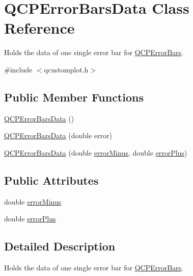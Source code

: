 \hypertarget{class_q_c_p_error_bars_data}{}\section{Q\+C\+P\+Error\+Bars\+Data Class Reference}
\label{class_q_c_p_error_bars_data}


Holds the data of one single error bar for \hyperlink{class_q_c_p_error_bars}{Q\+C\+P\+Error\+Bars}.  




{\ttfamily \#include $<$qcustomplot.\+h$>$}

\subsection*{Public Member Functions}
\begin{DoxyCompactItemize}
\item 
\hyperlink{class_q_c_p_error_bars_data_ac18bdb46dec56f8df7f3c99d058cc725}{Q\+C\+P\+Error\+Bars\+Data} ()
\item 
\hyperlink{class_q_c_p_error_bars_data_a73ebdaa55fa7f0052b70895b28edb444}{Q\+C\+P\+Error\+Bars\+Data} (double error)
\item 
\hyperlink{class_q_c_p_error_bars_data_a7c61e42d87aea3312262d5429bc28387}{Q\+C\+P\+Error\+Bars\+Data} (double \hyperlink{class_q_c_p_error_bars_data_af8aaea160e52c14c57836224ee78020b}{error\+Minus}, double \hyperlink{class_q_c_p_error_bars_data_ad1283c99fbfccf37a0226b1df52f0776}{error\+Plus})
\end{DoxyCompactItemize}
\subsection*{Public Attributes}
\begin{DoxyCompactItemize}
\item 
double \hyperlink{class_q_c_p_error_bars_data_af8aaea160e52c14c57836224ee78020b}{error\+Minus}
\item 
double \hyperlink{class_q_c_p_error_bars_data_ad1283c99fbfccf37a0226b1df52f0776}{error\+Plus}
\end{DoxyCompactItemize}


\subsection{Detailed Description}
Holds the data of one single error bar for \hyperlink{class_q_c_p_error_bars}{Q\+C\+P\+Error\+Bars}. 

